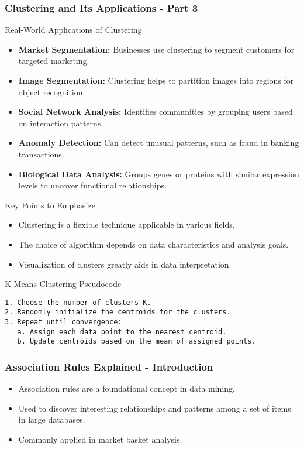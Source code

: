 \documentclass[aspectratio=169]{beamer}
\begin{document}
\begin{frame}[fragile]
    \frametitle{Clustering and Its Applications - Part 3}
    \begin{block}{Real-World Applications of Clustering}
        \begin{itemize}
            \item \textbf{Market Segmentation:} Businesses use clustering to segment customers for targeted marketing.
            \item \textbf{Image Segmentation:} Clustering helps to partition images into regions for object recognition.
            \item \textbf{Social Network Analysis:} Identifies communities by grouping users based on interaction patterns.
            \item \textbf{Anomaly Detection:} Can detect unusual patterns, such as fraud in banking transactions.
            \item \textbf{Biological Data Analysis:} Groups genes or proteins with similar expression levels to uncover functional relationships.
        \end{itemize}
    \end{block}

    \begin{block}{Key Points to Emphasize}
        \begin{itemize}
            \item Clustering is a flexible technique applicable in various fields.
            \item The choice of algorithm depends on data characteristics and analysis goals.
            \item Visualization of clusters greatly aids in data interpretation.
        \end{itemize}
    \end{block}

    \begin{block}{K-Means Clustering Pseudocode}
        \begin{lstlisting}
1. Choose the number of clusters K.
2. Randomly initialize the centroids for the clusters.
3. Repeat until convergence:
   a. Assign each data point to the nearest centroid.
   b. Update centroids based on the mean of assigned points.
        \end{lstlisting}
    \end{block}
\end{frame}

\begin{frame}[fragile]
    \frametitle{Association Rules Explained - Introduction}
    \begin{itemize}
        \item Association rules are a foundational concept in data mining.
        \item Used to discover interesting relationships and patterns among a set of items in large databases.
        \item Commonly applied in market basket analysis.
    \end{itemize}
\end{frame}
\end{document}
